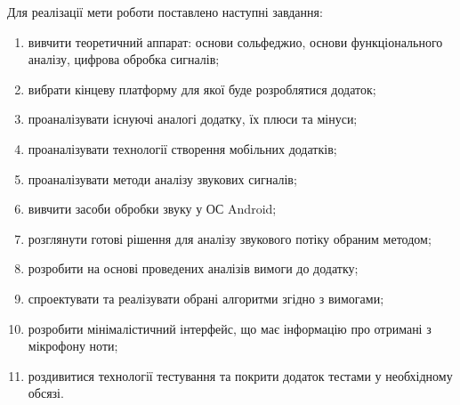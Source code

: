 Для реалізації мети роботи поставлено наступні завдання:
\begin{enumerate}
	\item вивчити теоретичний аппарат: основи сольфеджио, основи функціонального аналізу, цифрова обробка сигналів;

    \item вибрати кінцеву платформу для якої буде розроблятися додаток;

    \item проаналізувати існуючі аналогі додатку, їх плюси та мінуси;

    \item проаналізувати технології створення мобільних додатків;

    \item проаналізувати методи аналізу звукових сигналів;

    \item вивчити засоби обробки звуку у ОС Android;

    \item розглянути готові рішення для аналізу звукового потіку обраним методом;

    \item розробити на основі проведених аналізів вимоги до додатку;

    \item спроектувати та реалізувати обрані алгоритми згідно з вимогами;
    
    \item розробити мінімалістичний інтерфейс, що має інформацію про отримані з мікрофону ноти;

    \item роздивитися технології тестування та покрити додаток тестами у необхідному обсязі.
\end{enumerate}

